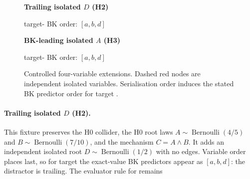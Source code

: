\documentclass[11pt]{article}
\DeclareRobustCommand{\code}[1]{\texttt{\detokenize{#1}}}
\begin{document}
\begin{figure}[ht]
\centering
\begin{minipage}[t]{0.47\textwidth}
\centering
\textbf{Trailing isolated \(D\) (H2)}


\small target-\code{c} BK order: \([a,b,d]\)
\end{minipage}
\hfill
\begin{minipage}[t]{0.47\textwidth}
\centering
\textbf{BK-leading isolated \(A\) (H3)}


\small target-\code{c} BK order: \([a,b,d]\)
\end{minipage}
\caption{Controlled four-variable extensions. Dashed red nodes are independent
isolated variables. Serialisation order induces the stated BK predictor order
for target \code{c}.}
\label{fig:extended-fixtures}
\end{figure}

\paragraph{Trailing isolated \(D\) (H2).}
This fixture preserves the H0 collider, the H0 root laws
\(A\sim\operatorname{Bernoulli}(4/5)\) and \(B\sim\operatorname{Bernoulli}(7/10)\),
and the mechanism \(C=A\land B\). It adds an independent isolated root
\(D\sim\operatorname{Bernoulli}(1/2)\) with no edges. Variable order places
\code{d} last, so for target \code{c} the exact-value BK predictors appear as
\([a,b,d]\): the distractor is trailing. The evaluator rule for \code{c}
remains
\end{document}
